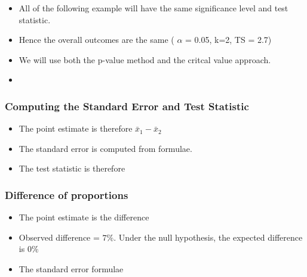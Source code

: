 ﻿\documentclass[a4]{beamer}
\begin{document}
\begin{frame}
\large
\begin{itemize}
\item All of the following example will have the same significance level and test statistic.
\item Hence the overall outcomes are the same ( $\alpha$ = 0.05, k=2, TS = 2.7)
\item We will use both the p-value method and the critcal value approach.
\item 
\end{itemize}
\end{frame}


\begin{frame}
\frametitle{Computing the Standard Error and Test Statistic }
\begin{itemize}
\item The point estimate is therefore $\bar{x}_1 -\bar{x}_2$
\item The standard error is computed from formulae.
\item The test statistic is therefore 
\end{itemize}
\end{frame}


\begin{frame}
\frametitle{Difference of proportions}
\large
\begin{itemize}
\item The point estimate is the difference 
\item Observed difference  = $7\%$. Under the null hypothesis, the expected difference is $0\%$
\item The standard error formulae
\end{itemize}
\end{frame}
\end{document}
